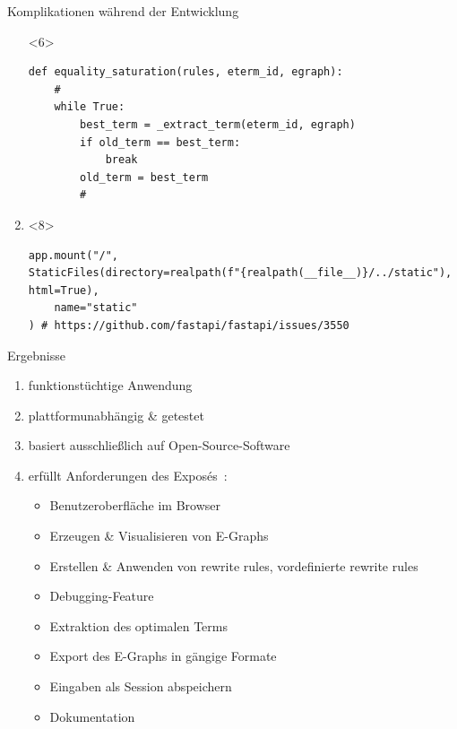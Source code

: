 \begin{frame}[fragile]{Komplikationen während der Entwicklung}
\begin{enumerate}
\begin{onlyenv}<6>
    \vspace{3mm}
    \begin{center}
\begin{verbatim}    
def equality_saturation(rules, eterm_id, egraph):
    #
    while True:
        best_term = _extract_term(eterm_id, egraph)
        if old_term == best_term:
            break
        old_term = best_term
        #  
\end{verbatim}
\end{center}
\end{onlyenv}
        
        \item {}
        
\begin{onlyenv}<8>
    \vspace{3mm}
    \begin{center}
\begin{verbatim}    
app.mount("/", 
StaticFiles(directory=realpath(f"{realpath(__file__)}/../static"), html=True),
    name="static"
) # https://github.com/fastapi/fastapi/issues/3550
\end{verbatim}
\end{center}
\end{onlyenv}

    \end{enumerate}
\end{frame}

\begin{frame}{Ergebnisse}
    \begin{enumerate}
        \item funktionstüchtige Anwendung
        \item plattformunabhängig \& getestet
        \item basiert ausschließlich auf Open-Source-Software
        \item erfüllt Anforderungen des Exposés~\cite{expose}:
        \begin{itemize}
            \item Benutzeroberfläche im Browser
            \item Erzeugen \& Visualisieren von E-Graphs
            \item Erstellen \& Anwenden von rewrite rules, vordefinierte rewrite rules
            \item Debugging-Feature
            \item Extraktion des optimalen Terms
            \item Export des E-Graphs in gängige Formate
            \item Eingaben als Session abspeichern
            \item Dokumentation
        \end{itemize}
    \end{enumerate}
\end{frame}

